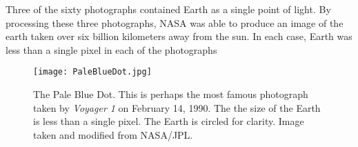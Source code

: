 Three of the sixty photographs contained Earth as a single point of light. By processing these three photographs, NASA was able to produce an image of the earth taken over six billion kilometers away from the sun. In each case, Earth was less than a single pixel in each of the photographs %

    \begin{figure}[ht]
    \centering
\texttt{[image: PaleBlueDot.jpg]}

        \caption{The Pale Blue Dot. This is perhaps the most famous photograph taken by \emph{Voyager 1} on February 14, 1990. The the size of the Earth is less than a single pixel. The Earth is circled for clarity. Image taken and modified from NASA/JPL.}
        \label{fig:pale_blue_dot}
    \end{figure}

